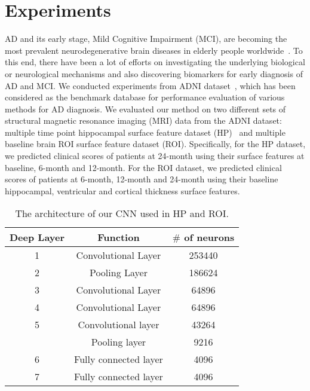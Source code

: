 \documentclass[10pt,twocolumn,letterpaper]{article}
\begin{document}
\vspace{-0.5em}
\section{Experiments}
AD and its early stage, Mild Cognitive Impairment (MCI), are becoming the most prevalent neurodegenerative brain diseases in elderly people worldwide~\cite{brookmeyer2007forecasting}. To this end, there have been a lot of efforts on investigating the underlying biological or neurological mechanisms and also discovering biomarkers for early diagnosis of AD and MCI. We conducted experiments from ADNI dataset~\cite{jack2008alzheimer}, which has been considered as the benchmark database for performance evaluation of various methods for AD diagnosis. We evaluated our method on two different sets of structural magnetic resonance imaging (MRI) data from the ADNI dataset: multiple time point hippocampal surface feature dataset (HP)~\cite{zhang2017multi} and multiple baseline brain ROI surface feature dataset (ROI). Specifically, for the HP dataset, we predicted clinical scores of patients at 24-month using their surface features at baseline, 6-month and 12-month. For the ROI dataset, we predicted clinical scores of patients at 6-month, 12-month and 24-month using their baseline hippocampal, ventricular and cortical thickness surface features.

\begin{table}[t]
\centering
\caption{The architecture of our CNN used in HP and ROI. }
\vspace{-0.5em}
\label{CNNarch}
 \begin{tabular}{|c|c|c|}
\hline
\captionsetup[table]{skip=10pt}
Deep Layer & Function &  $\#$ of neurons \\ \hline
1 & Convolutional Layer & 253440 \\ \hline
2 & Pooling Layer & 186624 \\ \hline
3 & Convolutional Layer & 64896 \\ \hline
4 & Convolutional Layer & 64896 \\ \hline
5 & Convolutional layer & 43264 \\
   & Pooling layer & 9216 \\ \hline
6 & Fully connected layer & 4096 \\ \hline
7 & Fully connected layer & 4096 \\ \hline
\end{tabular}
\end{table}
\end{document}
